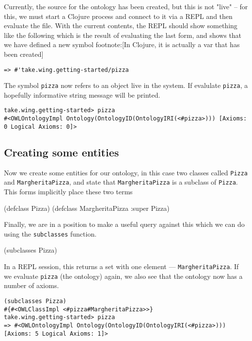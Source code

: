 Currently, the source for the ontology has been created, but this is not
"live" -- for this, we must start a Clojure process and connect to it
via a REPL and then evaluate the file. With the current contents, the
REPL should show something like the following which is the result of
evaluating the last form, and shows that we have defined a new symbol
footnote:[In Clojure, it is actually a var that has been created]

\begin{verbatim}
=> #'take.wing.getting-started/pizza
\end{verbatim}

The symbol \texttt{pizza} now refers to an object live in the system. If
evalulate \texttt{pizza}, a hopefully informative string message will be
printed.


\begin{verbatim}
take.wing.getting-started> pizza
#<OWLOntologyImpl Ontology(OntologyID(OntologyIRI(<#pizza>))) [Axioms: 0 Logical Axioms: 0]>
\end{verbatim}


\subsection{Creating some entities}
\label{sec-4-4}

Now we create some entities for our ontology, in this case two classes
called \texttt{Pizza} and \texttt{MargheritaPizza}, and state that \texttt{MargheritaPizza}
is a subclass of \texttt{Pizza}. This forms implicitly place these two terms


\begin{tawny}
(defclass Pizza)
(defclass MargheritaPizza :super Pizza)
\end{tawny}

Finally, we are in a position to make a useful query against this which
we can do using the \texttt{subclasses} function.

\begin{tawny}
(subclasses Pizza)
\end{tawny}

In a REPL session, this returns a set with one element ---
\texttt{MargheritaPizza}. If we evaluate \texttt{pizza} (the ontology) again, we also
see that the ontology now has a number of axioms.


\begin{verbatim}
(subclasses Pizza)
#{#<OWLClassImpl <#pizza#MargheritaPizza>>}
take.wing.getting-started> pizza
=> #<OWLOntologyImpl Ontology(OntologyID(OntologyIRI(<#pizza>))) [Axioms: 5 Logical Axioms: 1]>
\end{verbatim}


